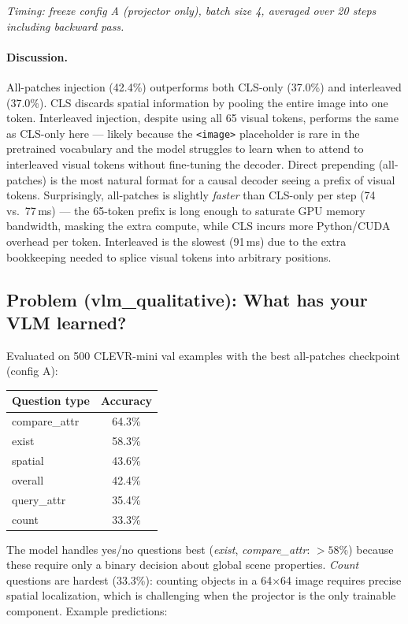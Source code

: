 \documentclass[11pt]{article}
\begin{document}
\noindent\textit{Timing: freeze config A (projector only), batch size 4, averaged over 20 steps including backward pass.}

\paragraph{Discussion.}
All-patches injection (42.4\%) outperforms both CLS-only (37.0\%) and interleaved (37.0\%). CLS discards spatial information by pooling the entire image into one token. Interleaved injection, despite using all 65 visual tokens, performs the same as CLS-only here --- likely because the \texttt{<image>} placeholder is rare in the pretrained vocabulary and the model struggles to learn when to attend to interleaved visual tokens without fine-tuning the decoder. Direct prepending (all-patches) is the most natural format for a causal decoder seeing a prefix of visual tokens. Surprisingly, all-patches is slightly \emph{faster} than CLS-only per step (74 vs.\ 77\,ms) --- the 65-token prefix is long enough to saturate GPU memory bandwidth, masking the extra compute, while CLS incurs more Python/CUDA overhead per token. Interleaved is the slowest (91\,ms) due to the extra bookkeeping needed to splice visual tokens into arbitrary positions.

\subsection*{Problem (vlm\_qualitative): What has your VLM learned?}

Evaluated on 500 CLEVR-mini val examples with the best all-patches checkpoint (config A):

\begin{center}
\begin{tabular}{lc}
\toprule
Question type & Accuracy \\
\midrule
compare\_attr & 64.3\% \\
exist         & 58.3\% \\
spatial       & 43.6\% \\
overall       & 42.4\% \\
query\_attr   & 35.4\% \\
count         & 33.3\% \\
\bottomrule
\end{tabular}
\end{center}

The model handles yes/no questions best (\textit{exist}, \textit{compare\_attr}: $>58\%$) because these require only a binary decision about global scene properties. \textit{Count} questions are hardest (33.3\%): counting objects in a 64$\times$64 image requires precise spatial localization, which is challenging when the projector is the only trainable component. Example predictions:
\end{document}
